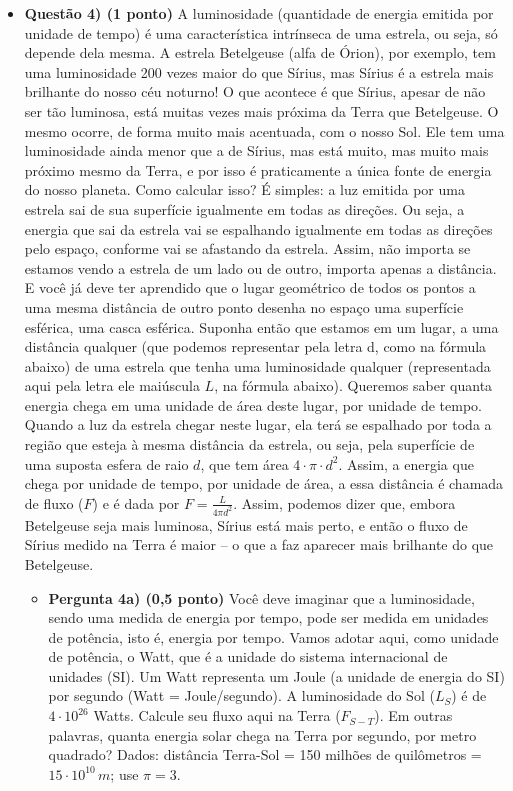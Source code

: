 \documentclass[a4paper, 12pt]{article}
\begin{document}
\begin{flushleft}
\begin{itemize}
        \item \textbf{Questão 4) (1 ponto)} A luminosidade (quantidade de energia emitida por unidade de tempo) é uma característica intrínseca de uma estrela, ou seja, só depende dela mesma. A estrela Betelgeuse (alfa de Órion), por exemplo, tem uma luminosidade 200 vezes maior do que Sírius, mas Sírius é a estrela mais brilhante do nosso céu noturno! O que acontece é que Sírius, apesar de não ser tão luminosa, está muitas vezes mais próxima da Terra que Betelgeuse. O mesmo ocorre, de forma muito mais acentuada, com o nosso Sol. Ele tem uma luminosidade ainda menor que a de Sírius, mas está muito, mas muito mais próximo mesmo da Terra, e por isso é praticamente a única fonte de energia do nosso planeta. Como calcular isso? É simples: a luz emitida por uma estrela sai de sua superfície igualmente em todas as direções. Ou seja, a energia que sai da estrela vai se espalhando igualmente em todas as direções pelo espaço, conforme vai se afastando da estrela. Assim, não importa se estamos vendo a estrela de um lado ou de outro, importa apenas a distância. E você já deve ter aprendido que o lugar geométrico de todos os pontos a uma mesma distância de outro ponto desenha no espaço uma superfície esférica, uma casca esférica. Suponha então que estamos em um lugar, a uma distância qualquer (que podemos representar pela letra d, como na fórmula abaixo) de uma estrela que tenha uma luminosidade qualquer (representada aqui pela letra ele maiúscula $L$, na fórmula abaixo). Queremos saber quanta energia chega em uma unidade de área deste lugar, por unidade de tempo. Quando a luz da estrela chegar neste lugar, ela terá se espalhado por toda a região que esteja à mesma distância da estrela, ou seja, pela superfície de uma suposta esfera de raio $d$, que tem área $4 \cdot \pi \cdot d^2$. Assim, a energia que chega por unidade de tempo, por unidade de área, a essa distância é chamada de fluxo ($F$) e é dada por $F = \frac{L}{4 \pi d^2}$. Assim, podemos dizer que, embora Betelgeuse seja mais luminosa, Sírius está mais perto, e então o fluxo de Sírius medido na Terra é maior -- o que a faz aparecer mais brilhante do que Betelgeuse.
            \begin{itemize}
                \item \textbf{Pergunta 4a) (0,5 ponto)} Você deve imaginar que a luminosidade, sendo uma medida de energia por tempo, pode ser medida em unidades de potência, isto é, energia por tempo. Vamos adotar aqui, como unidade de potência, o Watt, que é a unidade do sistema internacional de unidades (SI). Um Watt representa um Joule (a unidade de energia do SI) por segundo (Watt = Joule/segundo). A luminosidade do Sol ($L_S$) é de $4 \cdot 10^{26}$ Watts. Calcule seu fluxo aqui na Terra ($F_{S-T}$). Em outras palavras, quanta energia solar chega na Terra por segundo, por metro quadrado? Dados: distância Terra-Sol = 150 milhões de quilômetros = $15 \cdot 10^{10} \, m$; use $\pi = 3$.

\end{itemize}
\end{itemize}
\end{flushleft}
\end{document}
